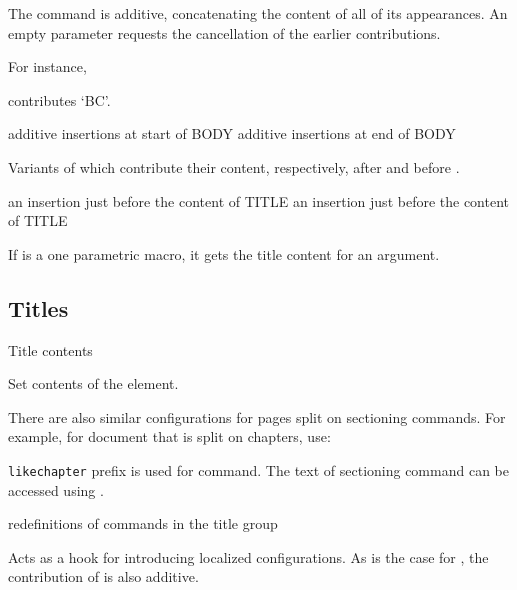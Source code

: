 The  command is additive, concatenating the
content of all of its appearances.  An empty parameter requests
the cancellation of the earlier contributions.

For instance,

\begin{texsource}
\end{texsource}

contributes `BC'.


 {additive insertions at start of BODY}\EndDoc
{} {additive insertions at end of BODY}\EndDoc

   Variants of  which contribute their content,
   respectively, after  and before .

 {an insertion just before the content of TITLE}\EndDoc
{} {an insertion just before the content of TITLE}\EndDoc

If  is a one parametric macro, it gets the title content for an
argument.



\subsection{Titles}

 {Title contents}\EndDoc

Set contents of the  element.

There are also similar configurations for pages split on sectioning commands. For example, for document that
is split on chapters, use:

\begin{texsource}
\end{texsource}

\texttt{likechapter} prefix is used for \texcommand{\chapter*} command. The text of sectioning command
can be accessed using .

 {redefinitions of commands in the title group}\EndDoc

Acts as a hook for introducing localized configurations. As is the case for
, the contribution of  is also
additive.


